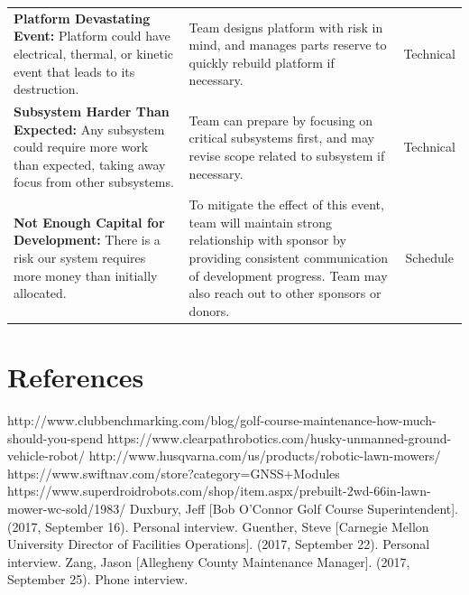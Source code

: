 \documentclass[12pt]{extarticle}
\begin{document}
\begin{table}[H]
\begin{tabular}{p{7cm}p{6cm}c}
 \textbf{Platform Devastating Event:} 
Platform could have electrical, thermal, or kinetic event that leads to its destruction.
&
Team designs platform with risk in mind, and manages parts reserve to quickly rebuild platform if necessary.
&
Technical\\

 \textbf{Subsystem Harder Than Expected:} 
Any subsystem could require more work than expected, taking away focus from other subsystems.
&
Team can prepare by focusing on critical subsystems first, and may revise scope related to subsystem if necessary.
&
Technical\\

\textbf{Not Enough Capital for Development:} 
There is a risk our system requires more money than initially allocated.
&
To mitigate the effect of this event, team will maintain strong relationship with sponsor by providing consistent communication of development progress. Team may also reach out to other sponsors or donors.
&
Schedule\\
\end{tabular}
\end{table}

\begingroup
\newpage
\section{References}
\renewcommand{\section}[2]{}%
\begin{thebibliography}{}
http://www.clubbenchmarking.com/blog/golf-course-maintenance-how-much-should-you-spend
https://www.clearpathrobotics.com/husky-unmanned-ground-vehicle-robot/
http://www.husqvarna.com/us/products/robotic-lawn-mowers/
https://www.swiftnav.com/store?category=GNSS+Modules
https://www.superdroidrobots.com/shop/item.aspx/prebuilt-2wd-66in-lawn-mower-wc-sold/1983/
Duxbury, Jeff [Bob O’Connor Golf Course Superintendent]. (2017, September 16). Personal interview.
Guenther, Steve [Carnegie Mellon University Director of Facilities Operations]. (2017, September 22). Personal interview.
Zang, Jason [Allegheny County Maintenance Manager]. (2017, September 25). Phone interview.
\end{thebibliography}
\endgroup
\end{document}
